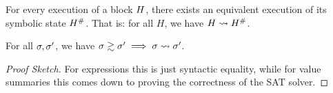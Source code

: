 {%


\begin{lemma}\label{thm:soundness}
  For every execution of a block $H$, there exists an equivalent execution
  of its symbolic state $H^{\#}$. That is: for all $H$, we have
  $H \mathrel{\leadsto} H^{\#}$.

\end{lemma}

\begin{lemma}\label{thm:correctness} For all $\sigma, \sigma'$, we have
  $\sigma \gtrsim
    \sigma' \implies \sigma \mathrel{\leadsto} \sigma'$.

  \begin{proof}[Proof Sketch] For
    expressions this is just syntactic equality, while for value summaries
    this comes down to proving the correctness of the SAT solver.
  \end{proof}
\end{lemma}

}
